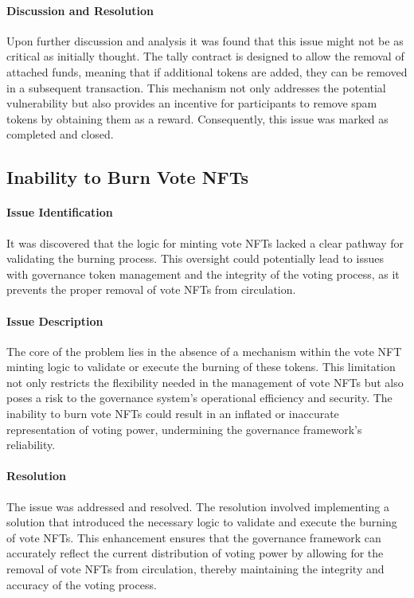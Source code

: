 \documentclass[11pt]{article}
\begin{document}
\paragraph{Discussion and Resolution}
Upon further discussion and analysis it was found that this issue might not be as critical as initially thought.
The tally contract is designed to allow the removal of attached funds, meaning that if additional tokens are added, they can be removed in a subsequent transaction.
This mechanism not only addresses the potential vulnerability but also provides an incentive for participants to remove spam tokens by obtaining them as a reward.
Consequently, this issue was marked as completed and closed.

\subsection{Inability to Burn Vote NFTs}

\paragraph{Issue Identification}
It was discovered that the logic for minting vote NFTs lacked a clear pathway for validating the burning process.
This oversight could potentially lead to issues with governance token management and the integrity of the voting process, as it prevents the proper removal of vote NFTs from circulation.

\paragraph{Issue Description}
The core of the problem lies in the absence of a mechanism within the vote NFT minting logic to validate or execute the burning of these tokens.
This limitation not only restricts the flexibility needed in the management of vote NFTs but also poses a risk to the governance system's operational efficiency and security.
The inability to burn vote NFTs could result in an inflated or inaccurate representation of voting power, undermining the governance framework's reliability.

\paragraph{Resolution}
The issue was addressed and resolved.
The resolution involved implementing a solution that introduced the necessary logic to validate and execute the burning of vote NFTs. This enhancement ensures that the governance framework can accurately reflect the current distribution of voting power by allowing for the removal of vote NFTs from circulation, thereby maintaining the integrity and accuracy of the voting process.
\end{document}
